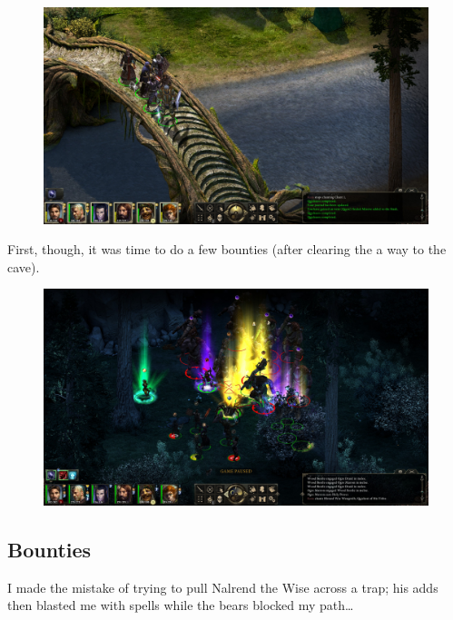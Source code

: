 \documentclass{article}
\begin{document}
\begin{figure}
\includegraphics[scale=0.33]{files/blog/2019_03_04_pillars_of_eternity_path_of_the_damned_act_iii/2019_03_04_elmshore2.jpg}
\end{figure}

First, though, it was time to do a few bounties (after clearing the a way to the cave).

\begin{figure}
\includegraphics[scale=0.33]{files/blog/2019_03_04_pillars_of_eternity_path_of_the_damned_act_iii/2019_03_04_elmshore3.jpg}
\end{figure}

\subsection{Bounties}

I made the mistake of trying to pull Nalrend the Wise across a trap; his adds then blasted me with spells while the bears blocked my path\ldots
\end{document}
